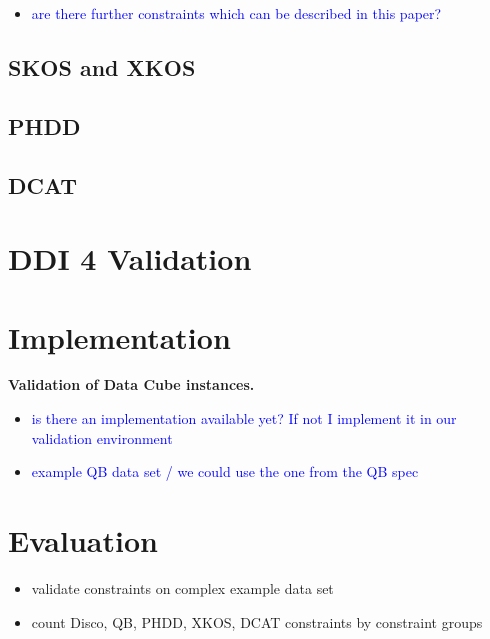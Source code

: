 \documentclass{elsart3p}    %
\begin{document}
{%


\begin{itemize}
	\item \textcolor{blue}{are there further constraints which can be described in this paper?}
\end{itemize}

\subsection{SKOS and XKOS}

\subsection{PHDD}

\subsection{DCAT}

\section{DDI 4 Validation}

\section{Implementation}

\textbf{Validation of Data Cube instances.}
\begin{itemize}
	\item \textcolor{blue}{is there an implementation available yet? If not I implement it in our validation environment}
	\item \textcolor{blue}{example QB data set / we could use the one from the QB spec}
\end{itemize}

\section{Evaluation}

\begin{itemize}
	\item validate constraints on complex example data set
	\item count Disco, QB, PHDD, XKOS, DCAT constraints by constraint groups 
\end{itemize}

}
\end{document}
